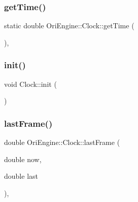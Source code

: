 \hypertarget{class_ori_engine_1_1_clock_addeddeb3e238c9f9d7c8f9b5e639fe18}{}\label{class_ori_engine_1_1_clock_addeddeb3e238c9f9d7c8f9b5e639fe18} 
\subsubsection{\texorpdfstring{get\+Time()}{getTime()}}
{\footnotesize\ttfamily static double Ori\+Engine\+::\+Clock\+::get\+Time (\begin{DoxyParamCaption}{ }\end{DoxyParamCaption})\hspace{0.3cm}{\ttfamily [inline]}, {\ttfamily [static]}}

\hypertarget{class_ori_engine_1_1_clock_aadaf546dbfb57577d2a9b0e9e4c95123}{}\label{class_ori_engine_1_1_clock_aadaf546dbfb57577d2a9b0e9e4c95123} 
\subsubsection{\texorpdfstring{init()}{init()}}
{\footnotesize\ttfamily void Clock\+::init (\begin{DoxyParamCaption}{ }\end{DoxyParamCaption})\hspace{0.3cm}{\ttfamily [static]}}

\hypertarget{class_ori_engine_1_1_clock_ae7323d08dc94df712cc7ebb8436eba63}{}\label{class_ori_engine_1_1_clock_ae7323d08dc94df712cc7ebb8436eba63} 
\subsubsection{\texorpdfstring{last\+Frame()}{lastFrame()}}
{\footnotesize\ttfamily double Ori\+Engine\+::\+Clock\+::last\+Frame (\begin{DoxyParamCaption}\item[{double}]{now,  }\item[{double}]{last }\end{DoxyParamCaption})\hspace{0.3cm}{\ttfamily [inline]}, {\ttfamily [static]}}

